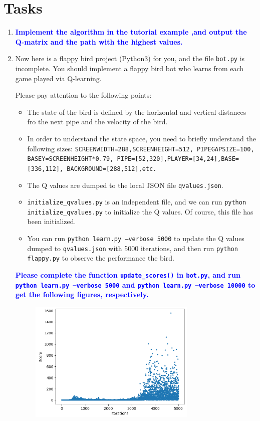 \documentclass[a4paper, 11pt]{article}
\begin{document}
\section{Tasks}
\begin{enumerate}
	\item \textcolor{blue}{\textbf{Implement the algorithm in the tutorial example ,and output the Q-matrix and the path with the highest values.}}
	\item Now here is a flappy bird project (Python3) for you, and the file \texttt{bot.py} is incomplete. You should implement a flappy bird bot who learns from each game played via Q-learning.

	Please pay attention to the following points:
	\begin{itemize}
		\item The state of the bird is defined by the horizontal and vertical distances fro the next pipe and the velocity of the bird.
		\item In order to understand the state space, you need to briefly understand the following sizes: \texttt{SCREENWIDTH=288,SCREENHEIGHT=512, PIPEGAPSIZE=100, BASEY=SCREENHEIGHT*0.79, PIPE=[52,320],PLAYER=[34,24],BASE=[336,112], BACKGROUND=[288,512],etc.}
		\item The Q values are dumped to the local JSON file \texttt{qvalues.json}.
		\item \texttt{initialize\_qvalues.py} is an independent file, and we can run \texttt{python initialize\_qvalues.py} to initialize the Q values. Of course, this file has been initialized.
		\item You can run \texttt{python learn.py --verbose 5000} to update the Q values dumped to \texttt{qvalues.json} with 5000 iterations, and then run \texttt{python flappy.py} to observe the performance the bird.
	\end{itemize}
	\textcolor{blue}{\textbf{Please complete the function \texttt{update\_scores()} in \texttt{bot.py}, and run \texttt{python learn.py --verbose 5000} and \texttt{python learn.py --verbose 10000} to get the following figures, respectively.}}
	\begin{figure}[H]
	\centering
	\includegraphics[width=8cm]{fig/score5000}

\end{figure}
\end{enumerate}
\end{document}
